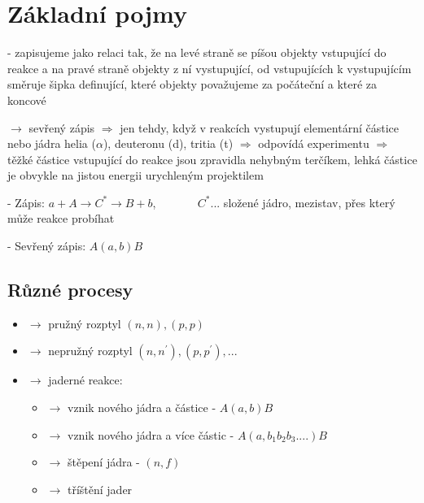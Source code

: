 \documentclass[../../main.tex]{subfiles}
\begin{document}
\section{Základní pojmy}

- zapisujeme jako relaci tak, že na levé straně se píšou objekty vstupující do reakce a na pravé straně objekty z ní vystupující, od vstupujících k vystupujícím směruje šipka definující, které objekty považujeme za počáteční a které za koncové

$\rightarrow$ sevřený zápis $\Rightarrow$ jen tehdy, když v reakcích vystupují elementární částice nebo jádra helia ($\alpha$), deuteronu (d), tritia (t) $\Rightarrow$ odpovídá experimentu $\Rightarrow$ těžké částice vstupující do reakce  jsou zpravidla nehybným terčíkem, lehká částice je obvykle na jistou energii urychleným projektilem

- Zápis: $a + A \rightarrow C^* \rightarrow B + b$, ~~~~~~ $C^*$... složené jádro, mezistav, přes který může reakce probíhat

- Sevřený zápis: $A(a,b)B$

\subsection{Různé procesy}
\begin{itemize}
	\item $\rightarrow$ pružný rozptyl $(n,n), (p,p)$
	\item $\rightarrow$ nepružný rozptyl $(n,n^{'}), (p, p^{'}),...$
	\item $\rightarrow$ jaderné reakce: 
	\begin{itemize}
		\item $\rightarrow$ vznik nového jádra a částice - $A(a,b)B$
		\item $\rightarrow$ vznik nového jádra a více částic - $A(a,b_1 b_2 b_3....)B$
		\item $\rightarrow$ štěpení jádra - $(n,f)$
		\item $\rightarrow$ tříštění jader
	\end{itemize}
\end{itemize}
\end{document}
